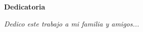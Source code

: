 \newpage
{\Large \bfseries Dedicatoria\par}

\begin{flushright}
    \itshape Dedico este trabajo a mi familia y amigos...
\end{flushright}